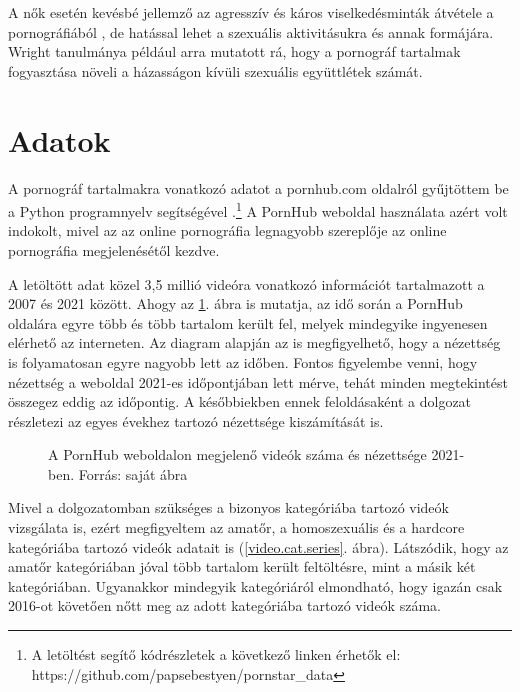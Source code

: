 \documentclass[12pt,a4paper]{article}
\begin{document}
A nők esetén kevésbé jellemző az agresszív és káros viselkedésminták átvétele a pornográfiából \citep{bridges2016sexual}, de hatással lehet a szexuális aktivitásukra és annak formájára. Wright \citeyearpar{wright2013internet} tanulmánya például arra mutatott rá, hogy a pornográf tartalmak fogyasztása növeli a házasságon kívüli szexuális együttlétek számát.

\section{Adatok}

A pornográf tartalmakra vonatkozó adatot a pornhub.com oldalról gyűjtöttem be a Python programnyelv segítségével \citep{pornhub2021}.\footnote{A letöltést segítő kódrészletek a következő linken érhetők el: https://github.com/papsebestyen/pornstar\_data} A PornHub weboldal használata azért volt indokolt, mivel az az online pornográfia legnagyobb szereplője az online pornográfia megjelenésétől kezdve.

A letöltött adat közel 3,5 millió videóra vonatkozó információt tartalmazott a 2007 és 2021 között. Ahogy az \ref{video.all.series}. ábra is mutatja, az idő során a PornHub oldalára egyre több és több tartalom került fel, melyek mindegyike ingyenesen elérhető az interneten. Az diagram alapján az is megfigyelhető, hogy a nézettség is folyamatosan egyre nagyobb lett az időben. Fontos figyelembe venni, hogy nézettség a weboldal 2021-es időpontjában lett mérve, tehát minden megtekintést összegez eddig az időpontig. A későbbiekben ennek feloldásaként a dolgozat részletezi az egyes évekhez tartozó nézettsége kiszámítását is.

\begin{figure}[h]
    \caption[A pornográf videók száma és nézettsége 2021-ben]{\footnotesize{A PornHub weboldalon megjelenő videók száma és nézettsége 2021-ben. Forrás: saját ábra}}
    \label{video.all.series}
    \begin{center}
        
    \end{center}
\end{figure}

Mivel a dolgozatomban szükséges a bizonyos kategóriába tartozó videók vizsgálata is, ezért megfigyeltem az amatőr, a homoszexuális és a hardcore kategóriába tartozó videók adatait is (\ref{video.cat.series}. ábra). Látszódik, hogy az amatőr kategóriában jóval több tartalom került feltöltésre, mint a másik két kategóriában. Ugyanakkor mindegyik kategóriáról elmondható, hogy igazán csak 2016-ot követően nőtt meg az adott kategóriába tartozó videók száma.
\end{document}
